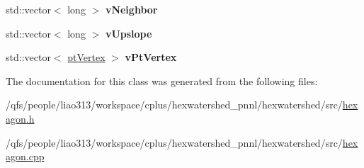 \begin{DoxyCompactItemize}
\item 
\hypertarget{classhexwatershed_1_1hexagon_aed524e274a6b17551e0af17a0e567be3}{std\-::vector$<$ long $>$ {\bfseries v\-Neighbor}}\label{classhexwatershed_1_1hexagon_aed524e274a6b17551e0af17a0e567be3}

\item 
\hypertarget{classhexwatershed_1_1hexagon_a71e1777d004ed62b1680a84d39b42287}{std\-::vector$<$ long $>$ {\bfseries v\-Upslope}}\label{classhexwatershed_1_1hexagon_a71e1777d004ed62b1680a84d39b42287}

\item 
\hypertarget{classhexwatershed_1_1hexagon_ab68cf5357b69868ffdb4ff9dec64f441}{std\-::vector$<$ \hyperlink{structhexwatershed_1_1ptVertex}{pt\-Vertex} $>$ {\bfseries v\-Pt\-Vertex}}\label{classhexwatershed_1_1hexagon_ab68cf5357b69868ffdb4ff9dec64f441}

\end{DoxyCompactItemize}


The documentation for this class was generated from the following files\-:\begin{DoxyCompactItemize}
\item 
/qfs/people/liao313/workspace/cplus/hexwatershed\-\_\-pnnl/hexwatershed/src/\hyperlink{hexagon_8h}{hexagon.\-h}\item 
/qfs/people/liao313/workspace/cplus/hexwatershed\-\_\-pnnl/hexwatershed/src/\hyperlink{hexagon_8cpp}{hexagon.\-cpp}\end{DoxyCompactItemize}
